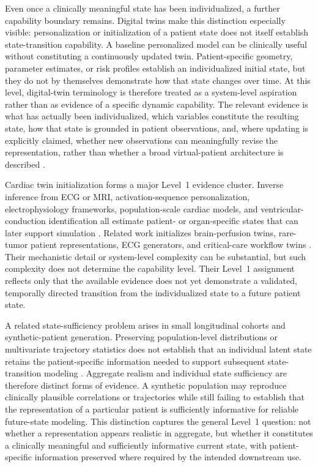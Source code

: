 Even once a clinically meaningful state has been individualized, a further capability boundary remains. Digital twins make this distinction especially visible: personalization or initialization of a patient state does not itself establish state-transition capability. A baseline personalized model can be clinically useful without constituting a continuously updated twin. Patient-specific geometry, parameter estimates, or risk profiles establish an individualized initial state, but they do not by themselves demonstrate how that state changes over time. At this level, digital-twin terminology is therefore treated as a system-level aspiration rather than as evidence of a specific dynamic capability. The relevant evidence is what has actually been individualized, which variables constitute the resulting state, how that state is grounded in patient observations, and, where updating is explicitly claimed, whether new observations can meaningfully revise the representation, rather than whether a broad virtual-patient architecture is described \citep{iqbal2025consensus,katsoulakis2024digital,ghatti2023digital}.

Cardiac twin initialization forms a major Level~1 evidence cluster. Inverse inference from ECG or MRI, activation-sequence personalization, electrophysiology frameworks, population-scale cardiac models, and ventricular-conduction identification all estimate patient- or organ-specific states that can later support simulation \citep{li2024toward,sanchez2025enhancing,camps2024digital,ugurlu2025cardiac,gillette2021framework,grandits2025accurate}. Related work initializes brain-perfusion twins, rare-tumor patient representations, ECG generators, and critical-care workflow twins \citep{lee2026hemopic,lammert2025large,wang2025simulator,kuruppu2025health}. Their mechanistic detail or system-level complexity can be substantial, but such complexity does not determine the capability level. Their Level~1 assignment reflects only that the available evidence does not yet demonstrate a validated, temporally directed transition from the individualized state to a future patient state.

A related state-sufficiency problem arises in small longitudinal cohorts and synthetic-patient generation. Preserving population-level distributions or multivariate trajectory statistics does not establish that an individual latent state retains the patient-specific information needed to support subsequent state-transition modeling \citep{varner2026validated}. Aggregate realism and individual state sufficiency are therefore distinct forms of evidence. A synthetic population may reproduce clinically plausible correlations or trajectories while still failing to establish that the representation of a particular patient is sufficiently informative for reliable future-state modeling. This distinction captures the general Level~1 question: not whether a representation appears realistic in aggregate, but whether it constitutes a clinically meaningful and sufficiently informative current state, with patient-specific information preserved where required by the intended downstream use.

